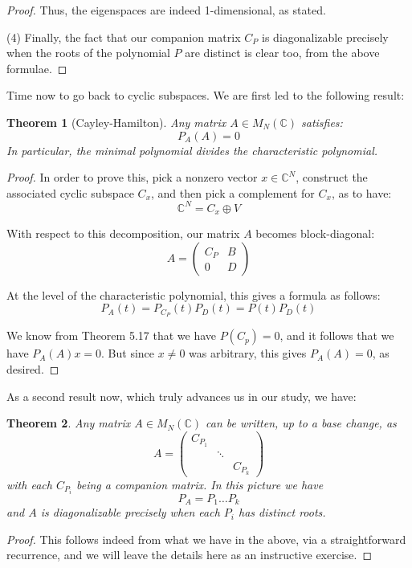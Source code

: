 \documentclass[12pt]{amsbook}
\newtheorem{theorem}{Theorem}[chapter]
\begin{document}
\begin{proof}
Thus, the eigenspaces are indeed 1-dimensional, as stated.

\medskip

(4) Finally, the fact that our companion matrix $C_P$ is diagonalizable precisely when the roots of the polynomial $P$ are distinct is clear too, from the above formulae.
\end{proof}

Time now to go back to cyclic subspaces. We are first led to the following result:

\begin{theorem}[Cayley-Hamilton]
Any matrix $A\in M_N(\mathbb C)$ satisfies:
$$P_A(A)=0$$
In particular, the minimal polynomial divides the characteristic polynomial.
\end{theorem}

\begin{proof}
In order to prove this, pick a nonzero vector $x\in\mathbb C^N$, construct the associated cyclic subspace $C_x$, and then pick a complement for $C_x$, as to have:
$$\mathbb C^N=C_x\oplus V$$

With respect to this decomposition, our matrix $A$ becomes block-diagonal:
$$A=\begin{pmatrix}C_P&B\\0&D\end{pmatrix}$$

At the level of the characteristic polynomial, this gives a formula as follows:
$$P_A(t)=P_{C_P}(t)P_D(t)=P(t)P_D(t)$$

We know from Theorem 5.17 that we have $P(C_p)=0$, and it follows that we have $P_A(A)x=0$. But since $x\neq0$ was arbitrary, this gives $P_A(A)=0$, as desired.
\end{proof}

As a second result now, which truly advances us in our study, we have:

\begin{theorem}
Any matrix $A\in M_N(\mathbb C)$ can be written, up to a base change, as
$$A=\begin{pmatrix}
C_{P_1}\\
&\ddots\\
&&C_{P_k}
\end{pmatrix}$$
with each $C_{P_i}$ being a companion matrix. In this picture we have
$$P_A=P_1\ldots P_k$$
and $A$ is diagonalizable precisely when each $P_i$ has distinct roots.
\end{theorem}

\begin{proof}
This follows indeed from what we have in the above, via a straightforward recurrence, and we will leave the details here as an instructive exercise.
\end{proof}
\end{document}
